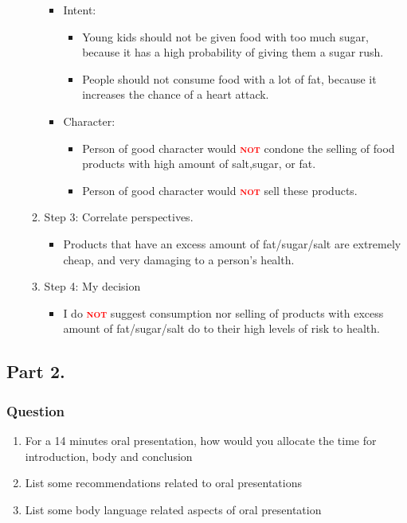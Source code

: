 \documentclass[a4paper, 10pt]{article}
\newcommand{\important}[1]{\textcolor{red}{\textbf{\textsc{#1}}}}
\begin{document}
\begin{enumerate}
\begin{enumerate}
\begin{itemize}
									\item Intent:
									\begin{itemize}
										\item Young kids should not be given food with too much sugar, because it has a high probability of giving them a sugar rush.
										\item People should not consume food with a lot of fat, because it increases the chance of a heart attack.
									\end{itemize}
								
									\item Character:
									\begin{itemize}
										\item Person of good character would \important{not} condone the selling of food products with high amount of salt,sugar, or fat.
										\item Person of good character would \important{not} sell these products.
									\end{itemize}
								\end{itemize}
								
								\item Step 3: Correlate perspectives.
								\begin{itemize}
									\item Products that have an excess amount of fat/sugar/salt are extremely cheap, and very damaging to a person's health.
								\end{itemize}
							
								\item Step 4: My decision
								\begin{itemize}
									\item I do \important{not} suggest consumption nor selling of products with excess amount of fat/sugar/salt do to their high levels of risk to health.
								\end{itemize}
						\end{enumerate}
				\end{enumerate}
			
			
		\pagebreak
		\subsection{Part 2.}
			\subsubsection{Question}
				\begin{enumerate}
					\item For a 14 minutes oral presentation, how would you allocate the time for introduction, body and conclusion
					\item List some recommendations related to oral presentations 
					\item List some body language related aspects of oral presentation
				\end{enumerate}
\end{document}
